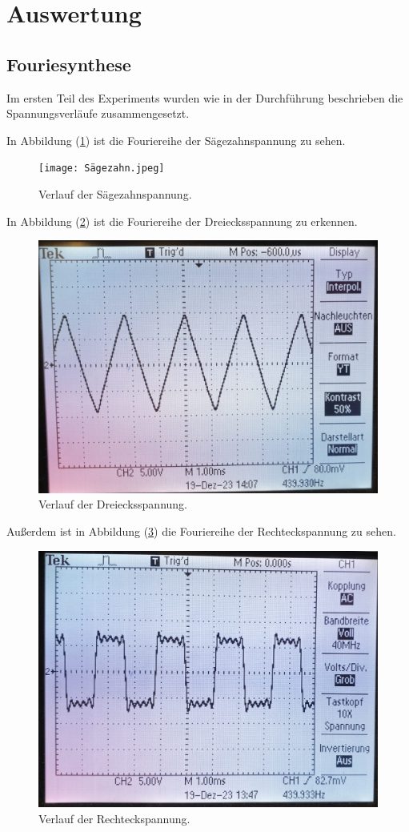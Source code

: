 \section{Auswertung}
\label{sec:Auswertung}

\subsection{Fouriesynthese}
Im ersten Teil des Experiments wurden wie in der Durchführung beschrieben die Spannungsverläufe zusammengesetzt. 

In Abbildung (\ref{fig:plot1}) ist die Fouriereihe der Sägezahnspannung zu sehen.
\begin{figure}[H]
  \centering
  \texttt{[image: Sägezahn.jpeg]}
  \caption{Verlauf der Sägezahnspannung.}
  \label{fig:plot1}
\end{figure}

In Abbildung (\ref{fig:plot2}) ist die Fouriereihe der Dreiecksspannung zu erkennen. 
\begin{figure}[H]
  \centering
  \includegraphics[width = 0.7\linewidth]{Dreieck.jpeg}
  \caption{Verlauf der Dreiecksspannung.}
  \label{fig:plot2}
\end{figure}

Außerdem ist in Abbildung (\ref{fig:plot3}) die Fouriereihe der Rechteckspannung zu sehen.
\begin{figure}[H]
  \centering
  \includegraphics[width = 0.7\linewidth]{Viereck.jpeg}
  \caption{Verlauf der Rechteckspannung.}
  \label{fig:plot3}
\end{figure}

